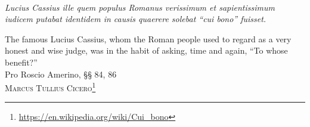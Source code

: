 
\mbox{}\\\vspace{1.5in}

\begin{center}
\begin{minipage}[c][]{0.6\linewidth}
  \raggedright
  \noindent\textit{Lucius Cassius ille quem populus Romanus verissimum et sapientissimum iudicem putabat identidem in causis quaerere solebat ``cui bono'' fuisset.}

  \bigskip\bigskip
  
  \noindent{}The famous Lucius Cassius, whom the Roman people used to regard as a very honest and wise judge, was in the habit of asking, time and again, ``To whose benefit?''\\ 
  \raggedleft
  Pro Roscio Amerino, §§ 84, 86\\
  \textsc{Marcus Tullius Cicero}\footnote{\url{https://en.wikipedia.org/wiki/Cui_bono}}
\end{minipage}
\end{center}

